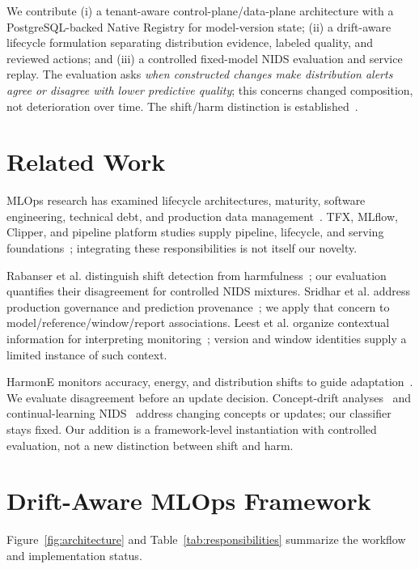 \documentclass[runningheads]{llncs}
\begin{document}
We contribute (i) a tenant-aware control-plane/data-plane architecture with a PostgreSQL-backed Native Registry for model-version state; (ii) a drift-aware lifecycle formulation separating distribution evidence, labeled quality, and reviewed actions; and (iii) a controlled fixed-model NIDS evaluation and service replay. The evaluation asks \emph{when constructed changes make distribution alerts agree or disagree with lower predictive quality}; this concerns changed composition, not deterioration over time. The shift/harm distinction is established~\cite{rabanser2019}.

\section{Related Work}
MLOps research has examined lifecycle architectures, maturity, software engineering, technical debt, and production data management~\cite{kreuzberger2023mlops,john2021towards,amershi2019software,sculley2015debt,polyzotis2017data}. TFX, MLflow, Clipper, and pipeline platform studies supply pipeline, lifecycle, and serving foundations~\cite{baylor2017tfx,mlflow,crankshaw2017clipper,zhou2020pipeline}; integrating these responsibilities is not itself our novelty.

Rabanser et al. distinguish shift detection from harmfulness~\cite{rabanser2019}; our evaluation quantifies their disagreement for controlled NIDS mixtures. Sridhar et al. address production governance and prediction provenance~\cite{sridhar2018}; we apply that concern to model/reference/window/report associations. Leest et al. organize contextual information for interpreting monitoring~\cite{leest2025}; version and window identities supply a limited instance of such context.

HarmonE monitors accuracy, energy, and distribution shifts to guide adaptation~\cite{Bhatt2025HarmonE}. We evaluate disagreement before an update decision. Concept-drift analyses~\cite{gama2014survey,webb2016drift} and continual-learning NIDS~\cite{Zhang2025SSFNIDS} address changing concepts or updates; our classifier stays fixed. Our addition is a framework-level instantiation with controlled evaluation, not a new distinction between shift and harm.

\section{Drift-Aware MLOps Framework}
\label{sec:framework}
Figure~\ref{fig:architecture} and Table~\ref{tab:responsibilities} summarize the workflow and implementation status.
\end{document}
